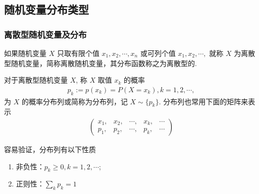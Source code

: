 \subsection{随机变量分布类型}
\begin{frame}
	\frametitle{离散型随机变量及分布}
	\begin{defi}[离散型随机变量] 如果随机变量 $X$ 只取有限个值 $x_1,x_2,\cdots, x_n$ 或可列个值 $x_1,x_2,\cdots,$ 就称 $X$ 为离散型随机变量，简称离散随机变量，其分布函数称之为离散型的.
	\end{defi}
	\pause
	\begin{defi}[离散型随机变量的分布列或概率质量函数] 对于离散型随机变量 $X$, 称 $X$ 取值 $x_k$ 的概率
		\begin{eqnarray*}
			p_k:=p(x_k)=P(X=x_k), k=1,2,\cdots,
		\end{eqnarray*}
		为 $X$ 的概率分布列或简称为分布列，记 $X\sim \{p_k\}$. 分布列也常用下面的矩阵来表示
		\begin{eqnarray*}
			\left(\begin{array}{ccccc}
				x_1, & x_2, & \cdots, & x_k, & \cdots  \\
				p_1, & p_2, & \cdots, & p_k, & \cdots
			\end{array}\right)
		\end{eqnarray*}
	\end{defi}
	\pause
	容易验证，分布列有以下性质
	\begin{enumerate}[<+-|alert@+>]
		\item 非负性：$p_k\ge 0, k=1,2,\cdots$;
		\item 正则性：$\sum_{k} p_k=1$
	\end{enumerate}


\end{frame}
